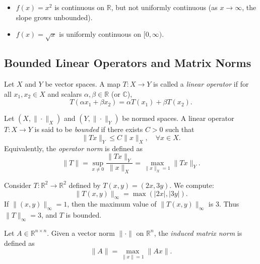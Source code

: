 \begin{example}
\begin{itemize}
    \item $f(x) = x^2$ is continuous on $\mathbb{R}$, but not uniformly continuous (as $x \to \infty$, the slope grows unbounded).  
    \item $f(x) = \sqrt{x}$ is uniformly continuous on $[0,\infty)$.  
\end{itemize}
\end{example}

\subsection{Bounded Linear Operators and Matrix Norms}

\begin{definition}
Let $X$ and $Y$ be vector spaces.  
A map $T:X \to Y$ is called a \emph{linear operator} if for all $x_1,x_2 \in X$ and scalars $\alpha,\beta \in \mathbb{R}$ (or $\mathbb{C}$),
\[
T(\alpha x_1 + \beta x_2) = \alpha T(x_1) + \beta T(x_2).
\]
\end{definition}

\begin{definition}
Let $(X,\|\cdot\|_X)$ and $(Y,\|\cdot\|_Y)$ be normed spaces.  
A linear operator $T:X \to Y$ is said to be \emph{bounded} if there exists $C>0$ such that
\[
\|Tx\|_Y \leq C \|x\|_X, \quad \forall x \in X.
\]
Equivalently, the \emph{operator norm} is defined as
\[
\|T\| = \sup_{x \neq 0} \frac{\|Tx\|_Y}{\|x\|_X} 
= \max_{\|x\|_X = 1} \|Tx\|_Y.
\]
\end{definition}

\begin{example}
Consider $T:\mathbb{R}^2 \to \mathbb{R}^2$ defined by $T(x,y) = (2x,3y)$.  
We compute:
\[
\|T(x,y)\|_\infty = \max(|2x|,|3y|).
\]
If $\|(x,y)\|_\infty = 1$, then the maximum value of $\|T(x,y)\|_\infty$ is $3$.  
Thus $\|T\|_\infty = 3$, and $T$ is bounded.  
\end{example}

\begin{definition}
Let $A \in \mathbb{R}^{n \times n}$.  
Given a vector norm $\|\cdot\|$ on $\mathbb{R}^n$, the \emph{induced matrix norm} is defined as
\[
\|A\| = \max_{\|x\|=1} \|Ax\|.
\]
\end{definition}

